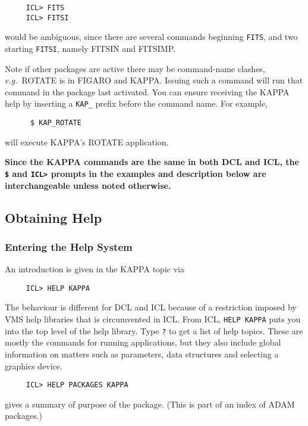 \small
\begin{verbatim}
     ICL> FITS
     ICL> FITSI
\end{verbatim}
\normalsize
would be ambiguous, since there are several commands beginning
{\tt FITS}, and two starting {\tt FITSI}, namely FITSIN and FITSIMP.

Note if other packages are active there may be command-name clashes, {\it
e.g.}\ ROTATE is in {\small FIGARO} and {\small KAPPA}.  Issuing such a
command will run that command in the package last activated.  You can
ensure receiving the {\small KAPPA} help by inserting a {\tt KAP\_}
prefix before the command name.  For example,

\small
\begin{verbatim}
      $ KAP_ROTATE
\end{verbatim}
\normalsize
will execute {\small KAPPA}'s ROTATE application. \medskip

{\large {\bf Since the {\normalsize{\bf KAPPA}} commands are the same in both
{\normalsize{\bf DCL}} and {\normalsize{\bf ICL}}, the {\tt \$} and {\tt ICL>} prompts in the
examples and description below are interchangeable unless noted
otherwise.}}

\subsection{Obtaining Help}
\subsubsection{Entering the Help System}
An introduction is given in the KAPPA topic via

\small
\begin{verbatim}
     ICL> HELP KAPPA
\end{verbatim}
\normalsize
The behaviour is different for {\small DCL} and {\small ICL} because
of a restriction imposed by VMS help libraries that is circumvented
in {\small ICL}.  From {\small ICL}, {\tt HELP KAPPA} puts you into the
top level of the help library.  Type {\tt ?} to get a list of
help topics.  These are mostly the commands for running
applications, but they also include global information on matters such
as parameters, data structures and selecting a graphics device.

\small
\begin{verbatim}
     ICL> HELP PACKAGES KAPPA
\end{verbatim}
\normalsize
gives a summary of purpose of the package. (This is part of an index
of {\small ADAM} packages.)

